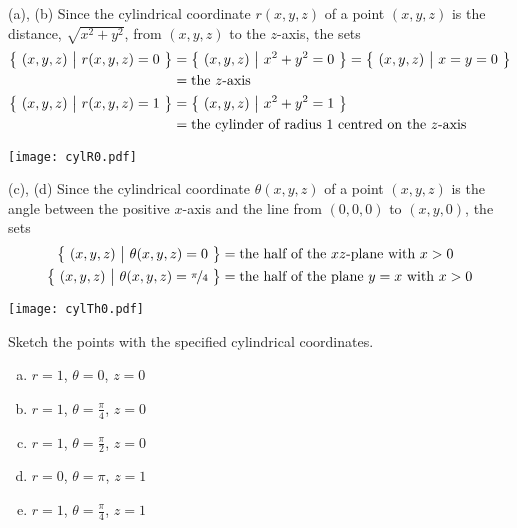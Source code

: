 \begin{solution}
(a), (b) Since the cylindrical coordinate $r(x,y,z)$ of a point $(x,y,z)$ is
the distance, $\sqrt{x^2+y^2}$, from $(x,y,z)$ to the $z$-axis, the sets
\begin{align*}
\big\{ \ (x,y,z)\ \big|\ r(x,y,z)=0\ \big\}
&=\big\{ \ (x,y,z)\ \big|\ x^2+y^2=0\ \big\}
=\big\{ \ (x,y,z)\ \big|\ x=y=0\ \big\} \\
&=\text{the $z$-axis} \\
\big\{ \ (x,y,z)\ \big|\ r(x,y,z)=1\ \big\}
&=\big\{ \ (x,y,z)\ \big|\ x^2+y^2=1\ \big\} \\
&=\text{the cylinder of radius $1$ centred on the $z$-axis}
\end{align*} 
\begin{center}
   \texttt{[image: cylR0.pdf]}\qquad\qquad
\end{center}

(c), (d)
Since the cylindrical coordinate $\theta(x,y,z)$ of a point $(x,y,z)$ is
the angle between the positive $x$-axis and the line from $(0,0,0)$ 
to $(x,y,0)$, the sets
\begin{align*}
\big\{ \ (x,y,z)\ \big|\ \theta(x,y,z)=0\ \big\}
&=\text{the half of the $xz$-plane with $x>0$} \\
\big\{ \ (x,y,z)\ \big|\ \theta(x,y,z)=\nicefrac{\pi}{4}\ \big\}
&=\text{the half of the plane $y=x$ with $x>0$}
\end{align*} 
\begin{center}
   \texttt{[image: cylTh0.pdf]}\qquad\qquad
\end{center}
\end{solution}


\begin{question}
Sketch the points with the specified cylindrical coordinates.
\begin{enumerate}[(a)]
\item
$r=1$, $\theta=0$, $z=0$
\item
$r=1$, $\theta=\frac{\pi}{4}$, $z=0$
\item
$r=1$, $\theta=\frac{\pi}{2}$, $z=0$
\item
$r=0$, $\theta=\pi$, $z=1$
\item
$r=1$, $\theta=\frac{\pi}{4}$, $z=1$
\end{enumerate}

\end{question}

%

